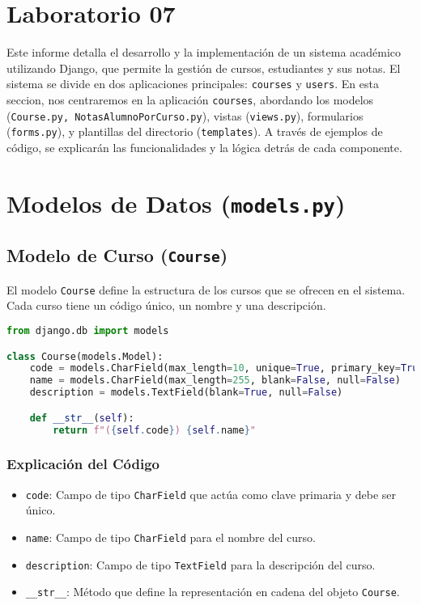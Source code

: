 \section{Laboratorio 07}

Este informe detalla el desarrollo y la implementación de un sistema académico utilizando Django, que permite la gestión de cursos, estudiantes y sus notas. El sistema se divide en dos aplicaciones principales: \texttt{courses} y \texttt{users}. En esta seccion, nos centraremos en la aplicación \texttt{courses}, abordando los modelos (\texttt{Course.py, NotasAlumnoPorCurso.py}), vistas (\texttt{views.py}), formularios (\texttt{forms.py}), y plantillas del directorio (\texttt{templates}). A través de ejemplos de código, se explicarán las funcionalidades y la lógica detrás de cada componente.

\section{Modelos de Datos (\texttt{models.py})}

\subsection{Modelo de Curso (\texttt{Course})}

El modelo \texttt{Course} define la estructura de los cursos que se ofrecen en el sistema. Cada curso tiene un código único, un nombre y una descripción.

\begin{lstlisting}[language=Python, caption=Modelo de Curso]
from django.db import models

class Course(models.Model):
    code = models.CharField(max_length=10, unique=True, primary_key=True, default='')
    name = models.CharField(max_length=255, blank=False, null=False)
    description = models.TextField(blank=True, null=False)

    def __str__(self):
        return f"({self.code}) {self.name}"
\end{lstlisting}

\subsubsection{Explicación del Código}

\begin{itemize}
    \item \texttt{code}: Campo de tipo \texttt{CharField} que actúa como clave primaria y debe ser único.
    \item \texttt{name}: Campo de tipo \texttt{CharField} para el nombre del curso.
    \item \texttt{description}: Campo de tipo \texttt{TextField} para la descripción del curso.
    \item \texttt{\_\_str\_\_}: Método que define la representación en cadena del objeto \texttt{Course}.
\end{itemize}

